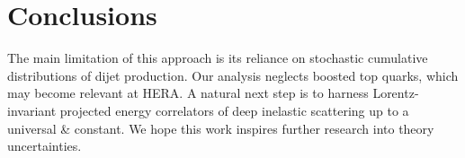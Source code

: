 \section{Conclusions}\label{sec:conclusions}

The main limitation of this approach is its reliance on stochastic
cumulative distributions of dijet production. Our analysis neglects
boosted top quarks, which may become relevant at HERA. A natural next
step is to harness Lorentz-invariant projected energy correlators of
deep inelastic scattering up to a universal & constant. We hope this work
inspires further research into theory uncertainties.

